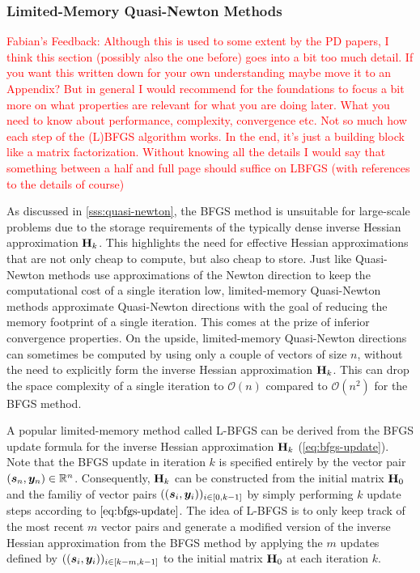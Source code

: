 \subsubsection{Limited-Memory Quasi-Newton Methods}\label{sss:limited-memory-quasi-newton}
\textcolor{red}{Fabian's Feedback: Although this is used to some extent by the PD papers, I think this section (possibly also the one before) 
goes into a bit too much detail. If you want this written down for your own understanding maybe move it to an Appendix? But in general I 
would recommend for the foundations to focus a bit more on what properties are relevant for what you are doing later.  What you need to 
know about performance, complexity, convergence etc. Not so much how each step of the (L)BFGS algorithm works. In the end, it's just a 
building block like a matrix factorization. Without knowing all the details I would say that something between a half and full page should 
suffice on LBFGS (with references to 
the details of course)}

As discussed in \cref{sss:quasi-newton}, the BFGS method is unsuitable for large-scale problems due to the storage requirements of the 
typically dense inverse Hessian approximation $\mathbf{H}_k$. This highlights the need for effective Hessian approximations that are not only
cheap to compute, but also cheap to store. Just like Quasi-Newton methods use approximations of the Newton direction to keep 
the computational cost of a single iteration low, limited-memory Quasi-Newton methods approximate Quasi-Newton directions with 
the goal of reducing the memory footprint of a single iteration. This comes at the prize of inferior convergence properties. On the upside,
limited-memory Quasi-Newton directions can sometimes be computed by using only a couple of vectors of size $n$, without the need to 
explicitly form the inverse Hessian approximation $\mathbf{H}_k$. This can drop the space complexity of a single iteration to $\mathcal{O}(n)$ 
compared to $\mathcal{O}(n^2)$ for the BFGS method.

A popular limited-memory method called L-BFGS can be derived from the BFGS update formula for the inverse Hessian approximation 
$\mathbf{H}_k$ (\cref{eq:bfgs-update}). Note that the BFGS update in iteration $k$ is specified entirely 
by the vector 
pair $(\bm{s}_n, \bm{y}_n) \in \mathbb{R}^n$. Consequently, $\mathbf{H}_k$ can be constructed from the initial matrix $\mathbf{H}_0$ and the familiy 
of vector pairs $((\bm{s}_i, \bm{y}_i))_{i \in [0, k-1]}$ by simply performing $k$ update steps according to $\autoref{eq:bfgs-update}$.
The idea of L-BFGS is to only keep track of the most recent $m$ vector pairs and generate a modified version of the inverse Hessian 
approximation from the BFGS method by applying the $m$ updates defined by $((\bm{s}_i, \bm{y}_i))_{i \in [k-m, k-1]}$ to the 
initial matrix $\mathbf{H}_0$ at each iteration $k$.

